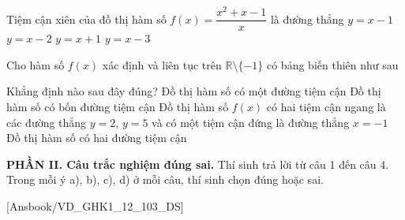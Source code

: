 \documentclass[12pt,a4paper,openany,oneside]{book}
\newcommand{\phanDe}[1]{\par\medskip\noindent #1\par\smallskip}
\begin{document}
\begin{ex}%
	Tiệm cận xiên của đồ thị hàm số $f(x)  = \dfrac{x^2+x-1}{x}$ là đường thẳng
	\choice 
		 {$y=x-1$}
		 {$y=x-2$}
		{\True$y=x+1$} 
		 {$y=x-3$}
\end{ex}

\begin{ex}%
	Cho hàm số $f(x)$ xác định và liên tục trên $\mathbb{R}\setminus \{-1\}$  có bảng biến thiên như sau
	\begin{center}
	\end{center}
	Khẳng định nào sau đây đúng? 
	 \choice
		{Đồ thị hàm số có một  đường tiệm cận}
		{Đồ  thị hàm số có bốn đường tiệm cận}
		{\True Đồ thị hàm số $f(x)$ có hai tiệm cận ngang  là các đường thẳng $y=2$, $y=5$ và có một tiệm cận đứng là đường thẳng $x=-1$}
		{Đồ thị hàm số có  hai đường tiệm cận}
\end{ex}


\phanDe{\textbf{PHẦN II. Câu trắc nghiệm đúng sai.} Thí sinh trả lời từ câu 1 đến câu 4. Trong mỗi ý a), b), c), d) ở mỗi câu, thí sinh chọn đúng hoặc sai.}

\setcounter{ex}{0}

[Ansbook/VD_GHK1_12_103_DS]
\end{document}
